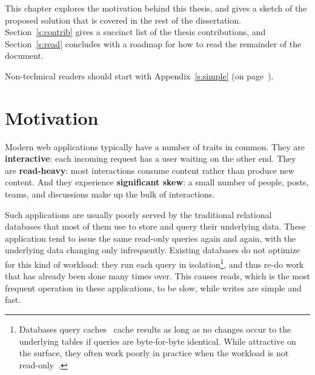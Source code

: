 This chapter explores the motivation behind this thesis, and gives a sketch of
the proposed solution that is covered in the rest of the dissertation.
Section~\ref{s:contrib} gives a succinct list of the thesis contributions, and
Section~\ref{s:read} concludes with a roadmap for how to read the remainder of
the document.

Non-technical readers should start with Appendix~\ref{s:simple} (on
page~\pageref{s:simple}).

\section{Motivation}

Modern web applications typically have a number of traits in common. They are
\textbf{interactive}: each incoming request has a user waiting on the other end.
They are \textbf{read-heavy}: most interactions consume content rather than
produce new content. And they experience \textbf{significant skew}: a small
number of people, posts, teams, and discussions make up the bulk of
interactions.

Such applications are usually poorly served by the traditional relational
databases that most of them use to store and query their underlying data. These
application tend to issue the same read-only queries again and again, with the
underlying data changing only infrequently. Existing databases do not optimize
for this kind of workload: they run each query in isolation\footnote{
Databases query caches~\cite{mysql-query-cache,pgpool-query-cache} cache results
as long as no changes occur to the underlying tables if queries are
byte-for-byte identical. While attractive on the surface, they often work poorly
in practice when the workload is not
read-only~\cite{mysql-query-cache-nope,pgpool-query-cache}.}, and thus re-do
work that has already been done many times over. This causes reads, which is the
most frequent operation in these applications, to be slow, while writes are
simple and fast.

